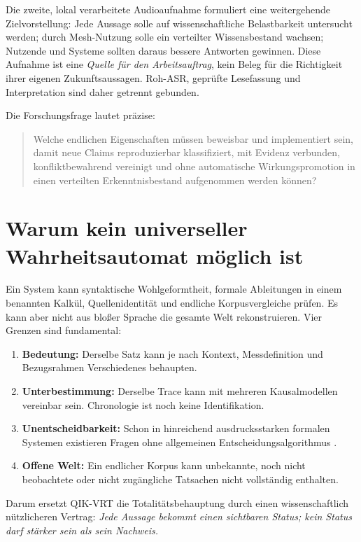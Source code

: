 \documentclass[11pt,a4paper,oneside]{article}
\begin{document}
Die zweite, lokal verarbeitete Audioaufnahme formuliert eine weitergehende
Zielvorstellung: Jede Aussage solle auf wissenschaftliche Belastbarkeit
untersucht werden; durch Mesh-Nutzung solle ein verteilter Wissensbestand
wachsen; Nutzende und Systeme sollten daraus bessere Antworten gewinnen. Diese
Aufnahme ist eine \emph{Quelle für den Arbeitsauftrag}, kein Beleg für die
Richtigkeit ihrer eigenen Zukunftsaussagen. Roh-ASR, geprüfte Lesefassung und
Interpretation sind daher getrennt gebunden.

Die Forschungsfrage lautet präzise:

\begin{quote}
Welche endlichen Eigenschaften müssen beweisbar und implementiert sein, damit
neue Claims reproduzierbar klassifiziert, mit Evidenz verbunden,
konfliktbewahrend vereinigt und ohne automatische Wirkungspromotion in einen
verteilten Erkenntnisbestand aufgenommen werden können?
\end{quote}

\section{Warum kein universeller Wahrheitsautomat möglich ist}

Ein System kann syntaktische Wohlgeformtheit, formale Ableitungen in einem
benannten Kalkül, Quellenidentität und endliche Korpusvergleiche prüfen. Es kann
aber nicht aus bloßer Sprache die gesamte Welt rekonstruieren. Vier Grenzen
sind fundamental:

\begin{enumerate}
  \item \textbf{Bedeutung:} Derselbe Satz kann je nach Kontext, Messdefinition
  und Bezugsrahmen Verschiedenes behaupten.
  \item \textbf{Unterbestimmung:} Derselbe Trace kann mit mehreren
  Kausalmodellen vereinbar sein. Chronologie ist noch keine Identifikation.
  \item \textbf{Unentscheidbarkeit:} Schon in hinreichend ausdrucksstarken
  formalen Systemen existieren Fragen ohne allgemeinen Entscheidungsalgorithmus
  \cite{Turing1937}.
  \item \textbf{Offene Welt:} Ein endlicher Korpus kann unbekannte, noch nicht
  beobachtete oder nicht zugängliche Tatsachen nicht vollständig enthalten.
\end{enumerate}

Darum ersetzt QIK-VRT die Totalitätsbehauptung durch einen wissenschaftlich
nützlicheren Vertrag: \emph{Jede Aussage bekommt einen sichtbaren Status; kein
Status darf stärker sein als sein Nachweis.}
\end{document}
